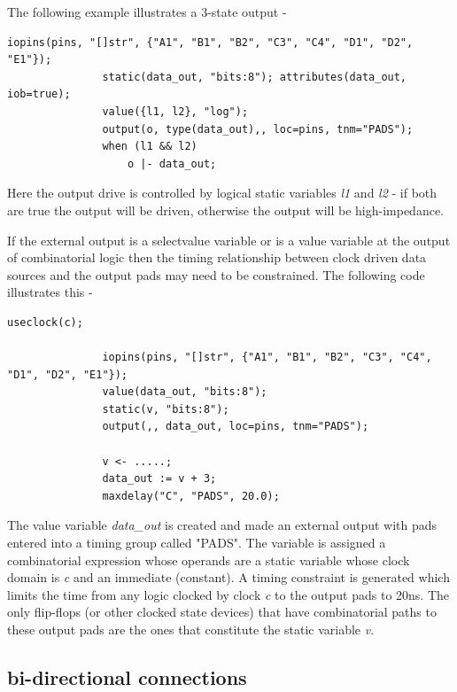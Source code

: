             The following example illustrates a 3-state output -
            \begin{lstlisting}[gobble=12, language=threepl]
               iopins(pins, "[]str", {"A1", "B1", "B2", "C3", "C4", "D1", "D2", "E1"});
               static(data_out, "bits:8"); attributes(data_out, iob=true);
               value({l1, l2}, "log");
               output(o, type(data_out),, loc=pins, tnm="PADS");
               when (l1 && l2)
                   o |- data_out;
            \end{lstlisting}
            Here the output drive is controlled by logical static variables
            {\em l1} and {\em l2} - if both are true the output will be
            driven, otherwise the output will be high-impedance.
            
            If the external output is a selectvalue variable or is a value
            variable at the output of combinatorial logic then the timing
            relationship between clock driven data sources and the output pads
            may need to be constrained. The following code illustrates this -
            \begin{lstlisting}[gobble=12, language=threepl]
               useclock(c);

               iopins(pins, "[]str", {"A1", "B1", "B2", "C3", "C4", "D1", "D2", "E1"});
               value(data_out, "bits:8");
               static(v, "bits:8");
               output(,, data_out, loc=pins, tnm="PADS");

               v <- .....;
               data_out := v + 3;
               maxdelay("C", "PADS", 20.0);
            \end{lstlisting}
            The value variable {\em data\_out} is created and made an external
            output with pads entered into a timing group called "PADS". The
            variable is assigned a combinatorial expression whose operands are
            a static variable whose clock domain is {\em c} and an immediate
            (constant). A timing constraint is generated which limits the time
            from any logic clocked by clock {\em c} to the output pads to
            20ns. The only flip-flops (or other clocked state devices) that
            have combinatorial paths to these output pads are the ones that
            constitute the static variable {\em v}.

        \subsection{bi-directional connections}

